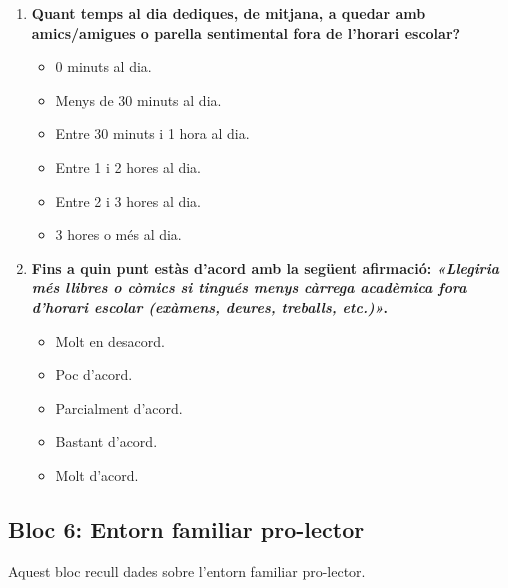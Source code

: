 \documentclass[12pt]{article}
\newcommand{\subsectiononumber}[1]{%
  \subsection*{#1}
  \phantomsection
}
\begin{document}
\begin{enumerate}
    \item \textbf{Quant temps al dia dediques, de mitjana, a quedar amb amics/amigues o parella sentimental fora de l'horari escolar?}
    \begin{itemize}
        \item[$\square$] 0 minuts al dia.
        \item[$\square$] Menys de 30 minuts al dia.
        \item[$\square$] Entre 30 minuts i 1 hora al dia.
        \item[$\square$] Entre 1 i 2 hores al dia.
        \item[$\square$] Entre 2 i 3 hores al dia.
        \item[$\square$] 3 hores o més al dia.
    \end{itemize}

    \item \textbf{Fins a quin punt estàs d'acord amb la següent afirmació: \textit{«Llegiria més llibres o còmics si tingués menys càrrega acadèmica fora d'horari escolar (exàmens, deures, treballs, etc.)»}.}
    \begin{itemize}
        \item[$\square$] Molt en desacord.
        \item[$\square$] Poc d'acord.
        \item[$\square$] Parcialment d'acord.
        \item[$\square$] Bastant d'acord.
        \item[$\square$] Molt d'acord.
    \end{itemize}
\end{enumerate}

\subsectiononumber{Bloc 6: Entorn familiar pro-lector}
Aquest bloc recull dades sobre l'entorn familiar pro-lector.
\end{document}
